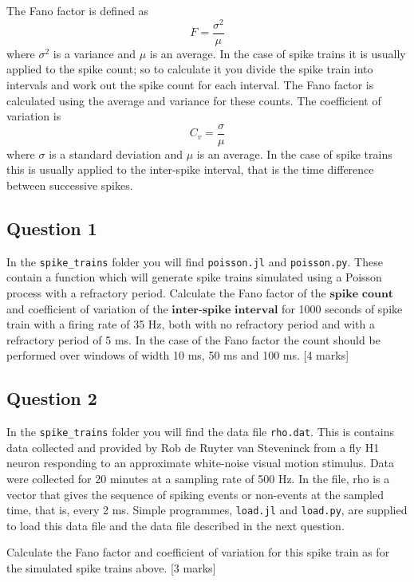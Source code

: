 \documentclass[12pt]{article}
\begin{document}
The Fano factor is defined as
\begin{equation}
F=\frac{\sigma^2}{\mu}
\end{equation}
where $\sigma^2$ is a variance and $\mu$ is an average.  In the
case of spike trains it is usually applied to the spike count; so to
calculate it you divide the spike train into intervals and work out
the spike count for each interval. The Fano factor is calculated using
the average and variance for these counts. The coefficient of variation is 
\begin{equation}
C_v=\frac{\sigma}{\mu}
\end{equation}
where $\sigma$ is a standard deviation and $\mu$ is an average. In the
case of spike trains this is usually applied to the inter-spike
interval, that is the time difference between successive spikes.

\subsection*{Question 1}

In the \texttt{spike\_trains} folder you will find
\texttt{poisson.jl} and \texttt{poisson.py}. These contain a function
which will generate spike trains simulated using a Poisson process
with a refractory period. Calculate the Fano factor of the $\textbf{spike count}$
and coefficient of variation of the $\textbf{inter-spike interval}$ for 1000
seconds of spike train with a firing rate of 35 Hz, both with no
refractory period and with a refractory period of 5 ms. In the case of
the Fano factor the count should be performed over windows of width 10
ms, 50 ms and 100 ms. [4 marks]

\subsection*{Question 2}

In the \texttt{spike\_trains} folder you will find the data file
\texttt{rho.dat}. This is contains data collected and provided by Rob
de Ruyter van Steveninck from a fly H1 neuron responding to an
approximate white-noise visual motion stimulus. Data were collected
for 20 minutes at a sampling rate of 500 Hz. In the file, rho is a
vector that gives the sequence of spiking events or non-events at the
sampled time, that is, every 2 ms. Simple programmes, \texttt{load.jl}
and \texttt{load.py}, are supplied to load this data file and the data
file described in the next question.

Calculate the Fano factor and coefficient of variation for this spike
train as for the simulated spike trains above. [3 marks]
\end{document}
